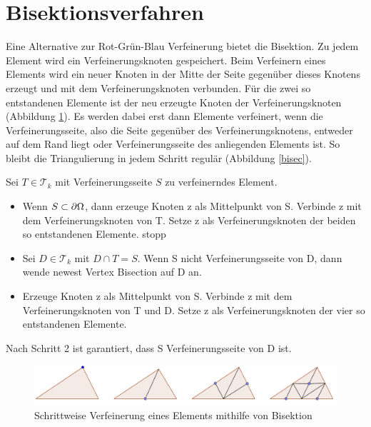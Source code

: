 \section{Bisektionsverfahren}
Eine Alternative zur Rot-Grün-Blau Verfeinerung bietet die Bisektion.  Zu jedem Element wird ein Verfeinerungsknoten gespeichert. Beim Verfeinern eines Elements wird ein neuer Knoten in der Mitte der Seite gegenüber dieses Knotens erzeugt und mit dem Verfeinerungsknoten verbunden. Für die zwei so entstandenen Elemente ist der neu erzeugte Knoten der Verfeinerungsknoten (Abbildung \ref{schbisek}). Es werden dabei erst dann Elemente verfeinert, wenn die Verfeinerungsseite, also die Seite gegenüber des Verfeinerungsknotens, entweder auf dem Rand liegt oder Verfeinerungsseite des anliegenden Elements ist. So bleibt die Triangulierung in jedem Schritt regulär (Abbildung \ref{bisec}).
\newpage
\begin{algorithmus}
	Sei $T\in \mathscr{T}_k$ mit Verfeinerungsseite $S$ zu verfeinerndes Element.
	\begin{itemize}
		\item[(1)] Wenn $S \subset \partial \Omega$, dann erzeuge Knoten z als Mittelpunkt von S. Verbinde z mit dem Verfeinerungsknoten von T. Setze z als Verfeinerungsknoten der beiden so entstandenen Elemente. stopp  
		\item[(2)] Sei $D \in \mathscr{T}_k$ mit $D\cap T = S$. Wenn S nicht Verfeinerungsseite von D, dann wende newest Vertex Bisection auf D an.
		\item[(3)] Erzeuge Knoten z als Mittelpunkt von S. Verbinde z mit dem Verfeinerungsknoten von T und D. Setze z als Verfeinerungsknoten der vier so entstandenen Elemente.
	\end{itemize}
\end{algorithmus}
Nach Schritt 2 ist garantiert, dass S Verfeinerungsseite von D ist. \\

\begin{figure}[!htbp]
	\begin{center}
		\includegraphics[width=16cm]{pics/bisec1.png}
	\end{center}
	\caption{\label{schbisek}Schrittweise Verfeinerung eines Elements mithilfe von Bisektion}
\end{figure}

